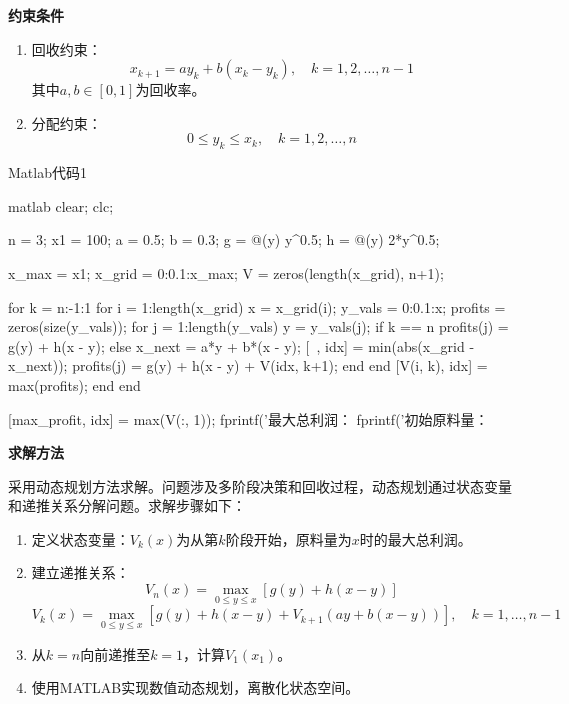 \textbf{约束条件}

\begin{enumerate}
    \item 回收约束：
    \[
    x_{k+1} = a y_k + b (x_k - y_k), \quad k=1,2,\dots,n-1
    \]
    其中$a, b \in [0, 1]$为回收率。
    \item 分配约束：
    \[
    0 \leq y_k \leq x_k, \quad k=1,2,\dots,n
    \]
\end{enumerate}

\begin{codebox}{Matlab代码}{1}
    \begin{amzcode}{matlab}
        clear; clc;

        n = 3; %
        x1 = 100; %
        a = 0.5; %
        b = 0.3; %
        g = @(y) y^0.5; %
        h = @(y) 2*y^0.5; %

        x_max = x1;
        x_grid = 0:0.1:x_max;
        V = zeros(length(x_grid), n+1); %

        for k = n:-1:1
            for i = 1:length(x_grid)
                x = x_grid(i);
                y_vals = 0:0.1:x; %
                profits = zeros(size(y_vals));
                for j = 1:length(y_vals)
                    y = y_vals(j);
                    if k == n
                        profits(j) = g(y) + h(x - y); %
                    else
                        x_next = a*y + b*(x - y);
                        [~, idx] = min(abs(x_grid - x_next));
                        profits(j) = g(y) + h(x - y) + V(idx, k+1);
                    end
                end
                [V(i, k), idx] = max(profits);
            end
        end

        [max_profit, idx] = max(V(:, 1));
        fprintf('最大总利润：%
        fprintf('初始原料量：%
    \end{amzcode}
\end{codebox}

\textbf{求解方法}

采用动态规划方法求解。问题涉及多阶段决策和回收过程，动态规划通过状态变量和递推关系分解问题。求解步骤如下：
\begin{enumerate}
    \item 定义状态变量：$V_k(x)$为从第$k$阶段开始，原料量为$x$时的最大总利润。
    \item 建立递推关系：
    \[
    V_n(x) = \max_{0 \leq y \leq x} \left[ g(y) + h(x - y) \right]
    \]
    \[
    V_k(x) = \max_{0 \leq y \leq x} \left[ g(y) + h(x - y) + V_{k+1}(a y + b (x - y)) \right], \quad k=1,\dots,n-1
    \]
    \item 从$k=n$向前递推至$k=1$，计算$V_1(x_1)$。
    \item 使用MATLAB实现数值动态规划，离散化状态空间。
\end{enumerate}

